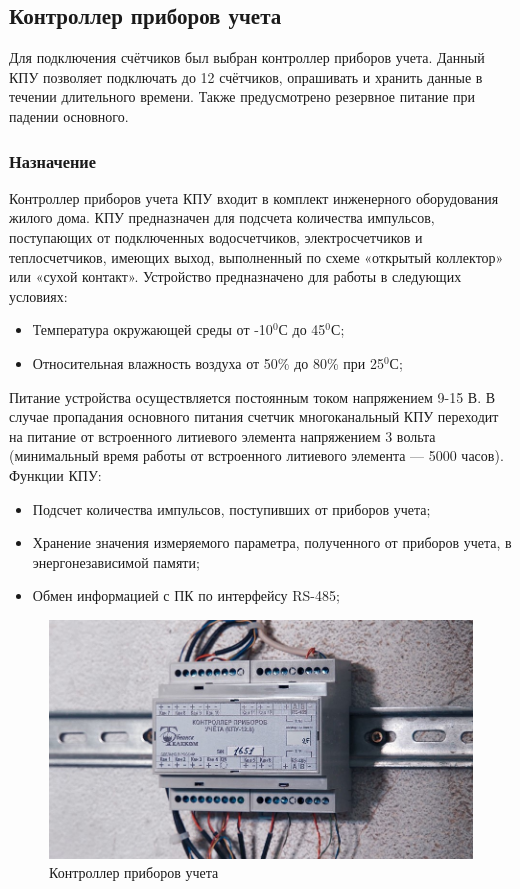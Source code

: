 \subsection{Контроллер приборов учета}

Для подключения счётчиков был выбран контроллер приборов учета. Данный КПУ позволяет подключать до 12 счётчиков, опрашивать и хранить данные в течении длительного времени. Также предусмотрено резервное питание при падении основного.

\subsubsection{Назначение}

Контроллер приборов учета КПУ входит в комплект инженерного оборудования жилого дома.
КПУ предназначен для подсчета количества импульсов, поступающих от подключенных водосчетчиков, электросчетчиков и теплосчетчиков, имеющих выход, выполненный по схеме «открытый коллектор» или «сухой контакт». 
Устройство предназначено для работы в следующих условиях:

\begin{itemize}
	\item Температура окружающей среды от -10$^{0}$С до 45$^{0}$С;
	\item Относительная влажность воздуха от 50\% до 80\% при 25$^{0}$С;
\end{itemize}

Питание устройства осуществляется постоянным током напряжением 9-15 В. В случае пропадания основного питания счетчик многоканальный КПУ переходит на питание от встроенного литиевого элемента напряжением 3 вольта (минимальный время работы от встроенного литиевого элемента --- 5000 часов).
Функции КПУ:

\begin{itemize}
	\item Подсчет количества импульсов, поступивших от приборов учета;
	\item Хранение значения измеряемого параметра, полученного от приборов учета, в энергонезависимой памяти;
	\item Обмен информацией с ПК по интерфейсу RS-485;
\end{itemize}

\begin{figure}
	\centering
	\includegraphics[width=0.7\linewidth]{pics/kpu}
	\caption{Контроллер приборов учета}
	\label{fig:kpu}
\end{figure}

